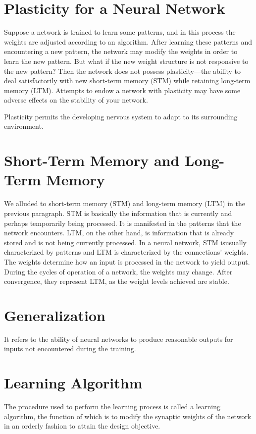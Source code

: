 \documentclass[12pt, right open]{memoir}
\begin{document}
\section{Plasticity for a Neural Network}
Suppose a network is trained to learn some patterns, and in this process the
weights are adjusted according to an algorithm. After learning these patterns
and encountering a new pattern, the network may modify the weights in order
to learn the new pattern. But what if the new weight structure is not responsive
to the new pattern? Then the network does not possess plasticity—the ability
to deal satisfactorily with new short-term memory (STM) while retaining
long-term memory (LTM). Attempts to endow a network with plasticity may
have some adverse effects on the stability of your network.

Plasticity permits the developing nervous system to adapt to its surrounding environment.
\section{Short-Term Memory and Long-Term Memory}
We alluded to short-term memory (STM) and long-term memory (LTM) in the
previous paragraph. STM is basically the information that is currently and
perhaps temporarily being processed. It is manifested in the patterns that the
network encounters. LTM, on the other hand, is information that is already
stored and is not being currently processed. In a neural network, STM isusually characterized by patterns and LTM is characterized by the
connections’ weights. The weights determine how an input is processed in the
network to yield output. During the cycles of operation of a network, the
weights may change. After convergence, they represent LTM, as the weight
levels achieved are stable.

\section{Generalization}
It refers to the ability of neural networks to produce reasonable outputs for inputs not encountered during the training.

\section{Learning Algorithm}
The procedure used to perform the learning process is called a learning algorithm, the function of which is to modify the synaptic weights of the network in an orderly fashion to attain the design objective.
\end{document}
